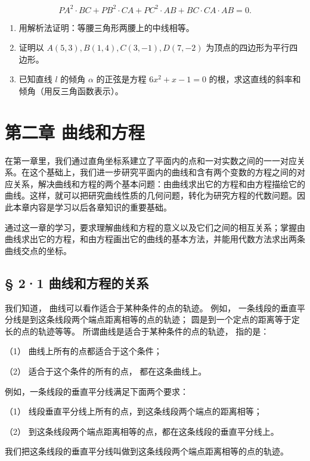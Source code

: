 \[
PA^{2} \cdot BC + PB^{2} \cdot CA + PC^{2} \cdot AB + BC \cdot CA \cdot AB = 0.
\]

\begin{enumerate}
\def\labelenumi{\arabic{enumi}.}
\setcounter{enumi}{5}
\item
  用解析法证明：等腰三角形两腰上的中线相等。
\item
  证明以 \(A(5,3), B(1,4), C(3,-1), D(7,-2)\)
  为顶点的四边形为平行四边形。
\item
  已知直线 \(l\) 的倾角 \(\alpha\) 的正弦是方程 \(6x^{2} + x - 1 = 0\)
  的根，求这直线的斜率和倾角（用反三角函数表示）。
\end{enumerate}

\chapter{第二章
曲线和方程}\label{ux7b2cux4e8cux7ae0-ux66f2ux7ebfux548cux65b9ux7a0b}

在第一章里，我们通过直角坐标系建立了平面内的点和一对实数之间的一一对应关系。在这个基础上，我们进一步研究平面内的曲线和含有两个变数的方程之间的对应关系，解决曲线和方程的两个基本问题：由曲线求出它的方程和由方程描绘它的曲线。这样，就可以把研究曲线性质的几何问题，转化为研究方程的代数问题。因此本章内容是学习以后各章知识的重要基础。

通过这一章的学习，要求理解曲线和方程的意义以及它们之间的相互关系；掌握由曲线求出它的方程，和由方程画出它的曲线的基本方法，并能用代数方法求出两条曲线交点的坐标。

\section{§ 2·1
曲线和方程的关系}\label{ux66f2ux7ebfux548cux65b9ux7a0bux7684ux5173ux7cfb}

我们知道， 曲线可以看作适合于某种条件的点的轨迹。 例如，
一条线段的垂直平分线是到这条线段两个端点距离相等的点的轨迹；
圆是到一个定点的距离等于定长的点的轨迹等等。
所谓曲线是适合于某种条件的点的轨迹， 指的是：

（1） 曲线上所有的点都适合于这个条件；

（2） 适合于这个条件的所有的点， 都在这条曲线上。

例如，一条线段的垂直平分线满足下面两个要求：

（1） 线段垂直平分线上所有的点，到这条线段两个端点的距离相等；

（2） 到这条线段两个端点距离相等的点，都在这条线段的垂直平分线上。

我们把这条线段的垂直平分线叫做到这条线段两个端点距离相等的点的轨迹。

